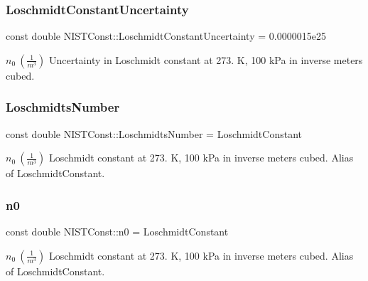 \subsubsection{\texorpdfstring{Loschmidt\+Constant\+Uncertainty}{LoschmidtConstantUncertainty}}
{\footnotesize\ttfamily const double N\+I\+S\+T\+Const\+::\+Loschmidt\+Constant\+Uncertainty = 0.\+0000015e25}

$n_0 \ (\frac{1}{m^3})$ Uncertainty in Loschmidt constant at 273. K, 100 k\+Pa in inverse meters cubed. \mbox{\label{group___loschmidt_constant_gaf6143a6202718104ded1b92da2a0217f}} 
\subsubsection{\texorpdfstring{Loschmidts\+Number}{LoschmidtsNumber}}
{\footnotesize\ttfamily const double N\+I\+S\+T\+Const\+::\+Loschmidts\+Number = Loschmidt\+Constant}

$n_0 \ (\frac{1}{m^3})$ Loschmidt constant at 273. K, 100 k\+Pa in inverse meters cubed. Alias of Loschmidt\+Constant. \mbox{\label{group___loschmidt_constant_ga95b0a12ed1a4d5aa9f05a08927be123c}} 
\subsubsection{\texorpdfstring{n0}{n0}}
{\footnotesize\ttfamily const double N\+I\+S\+T\+Const\+::n0 = Loschmidt\+Constant}

$n_0 \ (\frac{1}{m^3})$ Loschmidt constant at 273. K, 100 k\+Pa in inverse meters cubed. Alias of Loschmidt\+Constant. 
